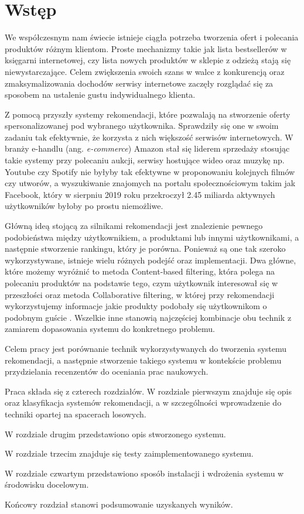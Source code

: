 \chapter{Wstęp}
\thispagestyle{chapterBeginStyle}

We współczesnym nam świecie istnieje ciągła potrzeba tworzenia ofert i polecania produktów różnym klientom. Proste mechanizmy takie jak lista bestsellerów w księgarni internetowej, czy lista nowych produktów w sklepie z odzieżą stają się niewystarczające. Celem zwiększenia swoich szans w walce z konkurencją oraz zmaksymalizowania dochodów serwisy internetowe zaczęły rozglądać się za sposobem na ustalenie gustu indywidualnego klienta.

Z pomocą przyszły systemy rekomendacji, które pozwalają na stworzenie oferty spersonalizowanej pod wybranego użytkownika. Sprawdziły się one w swoim zadaniu tak efektywnie, że korzysta z nich większość serwisów internetowych. W branży e-handlu (ang. \textit{e-commerce}) Amazon stał się liderem sprzedaży stosując takie systemy przy polecaniu aukcji, serwisy hostujące wideo oraz muzykę np. Youtube czy Spotify nie byłyby tak efektywne w proponowaniu kolejnych filmów czy utworów, a wyszukiwanie znajomych na portalu społecznościowym takim jak Facebook, który w sierpniu 2019 roku przekroczył 2.45 miliarda aktywnych użytkowników \cite{facebook} byłoby po prostu niemożliwe.

Główną ideą stojącą za silnikami rekomendacji jest znalezienie pewnego podobieństwa między użytkownikiem, a produktami lub innymi użytkownikami, a następnie stworzenie rankingu, który je porówna. Ponieważ są one tak szeroko wykorzystywane, istnieje wielu różnych podejść oraz implementacji. Dwa główne, które możemy wyróżnić to metoda Content-based filtering, która polega na polecaniu produktów na podstawie tego, czym użytkownik interesował się w przeszłości oraz metoda Collaborative filtering, w której przy rekomendacji wykorzystujemy informacje jakie produkty podobały się użytkownikom o podobnym guście \cite{RecommenderASurvey}. Wszelkie inne stanowią najczęściej kombinacje obu technik z zamiarem dopasowania systemu do konkretnego problemu.

Celem pracy jest porównanie technik wykorzystywanych do tworzenia systemu rekomendacji, a następnie stworzenie takiego systemu 
w kontekście problemu przydzielania recenzentów do oceniania prac naukowych.

Praca składa się z czterech rozdziałów.
W rozdziale pierwszym znajduje się opis oraz klasyfikacja systemów rekomendacji, 
a w szczególności wprowadzenie do techniki opartej na spacerach losowych.


W rozdziale drugim przedstawiono opis stworzonego systemu.

W rozdziale trzecim znajduje się testy zaimplementowanego systemu.

W rozdziale czwartym przedstawiono sposób instalacji i wdrożenia systemu w środowisku docelowym.

Końcowy rozdział stanowi podsumowanie uzyskanych wyników.